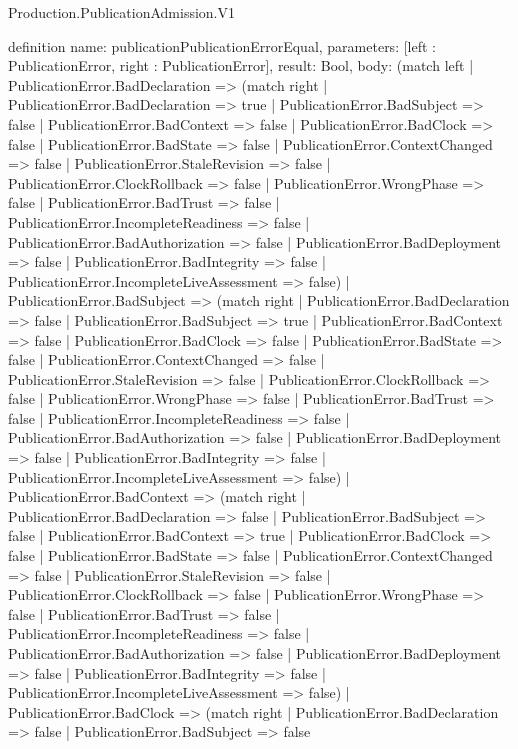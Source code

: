 \begin{lexlean}{Production.PublicationAdmission.V1}
\begin{semanticmodule}
definition{
  name: publicationPublicationErrorEqual,
  parameters: [left : PublicationError, right : PublicationError],
  result: Bool,
  body: (match left
    | PublicationError.BadDeclaration => (match right
      | PublicationError.BadDeclaration => true
      | PublicationError.BadSubject => false
      | PublicationError.BadContext => false
      | PublicationError.BadClock => false
      | PublicationError.BadState => false
      | PublicationError.ContextChanged => false
      | PublicationError.StaleRevision => false
      | PublicationError.ClockRollback => false
      | PublicationError.WrongPhase => false
      | PublicationError.BadTrust => false
      | PublicationError.IncompleteReadiness => false
      | PublicationError.BadAuthorization => false
      | PublicationError.BadDeployment => false
      | PublicationError.BadIntegrity => false
      | PublicationError.IncompleteLiveAssessment => false)
    | PublicationError.BadSubject => (match right
      | PublicationError.BadDeclaration => false
      | PublicationError.BadSubject => true
      | PublicationError.BadContext => false
      | PublicationError.BadClock => false
      | PublicationError.BadState => false
      | PublicationError.ContextChanged => false
      | PublicationError.StaleRevision => false
      | PublicationError.ClockRollback => false
      | PublicationError.WrongPhase => false
      | PublicationError.BadTrust => false
      | PublicationError.IncompleteReadiness => false
      | PublicationError.BadAuthorization => false
      | PublicationError.BadDeployment => false
      | PublicationError.BadIntegrity => false
      | PublicationError.IncompleteLiveAssessment => false)
    | PublicationError.BadContext => (match right
      | PublicationError.BadDeclaration => false
      | PublicationError.BadSubject => false
      | PublicationError.BadContext => true
      | PublicationError.BadClock => false
      | PublicationError.BadState => false
      | PublicationError.ContextChanged => false
      | PublicationError.StaleRevision => false
      | PublicationError.ClockRollback => false
      | PublicationError.WrongPhase => false
      | PublicationError.BadTrust => false
      | PublicationError.IncompleteReadiness => false
      | PublicationError.BadAuthorization => false
      | PublicationError.BadDeployment => false
      | PublicationError.BadIntegrity => false
      | PublicationError.IncompleteLiveAssessment => false)
    | PublicationError.BadClock => (match right
      | PublicationError.BadDeclaration => false
      | PublicationError.BadSubject => false
}
\end{semanticmodule}
\end{lexlean}
